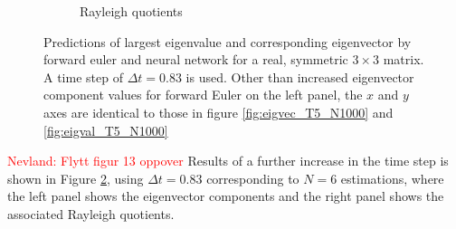 \documentclass[12pt]{extarticle}
\begin{document}
\begin{figure}[h]
\begin{subfigure}{0.49\textwidth}
		\caption{Rayleigh quotients}
		\label{fig:eigval_T5_N6}
	\end{subfigure}
	\caption{Predictions of largest eigenvalue and corresponding eigenvector by forward euler and neural network for a real, symmetric $3\times 3$ matrix. A time step of $\Delta t = 0.83$ is used. Other than increased eigenvector component values for forward Euler on the left panel, the $x$ and $y$ axes are identical to those in figure \ref{fig:eigvec_T5_N1000} and \ref{fig:eigval_T5_N1000}}
	\label{fig:eig_T5_N6}
\end{figure}

\textcolor{red}{Nevland: Flytt figur 13 oppover} Results of a further increase in the time step is shown in Figure \ref{fig:eig_T5_N6}, using $\Delta t= 0.83$ corresponding to $N=6$ estimations, where the left panel shows the eigenvector components and the right panel shows the associated Rayleigh quotients. 
\end{document}
